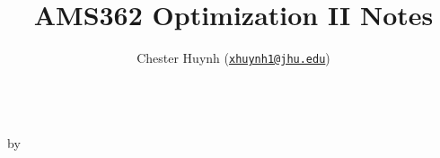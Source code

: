 \documentclass[11pt]{article}
\title{AMS362 Optimization II Notes}
\author{%
    Chester Huynh (\href{mailto:xhuynh1@jhu.edu}{\texttt{xhuynh1@jhu.edu}})
}
\begin{document}
\makeatletter
\begin{center}
  {\LARGE\bf \@title} \\ \vspace*{0.5cm}
  by \@author
\end{center}
\makeatother

\tableofcontents


\end{document}
